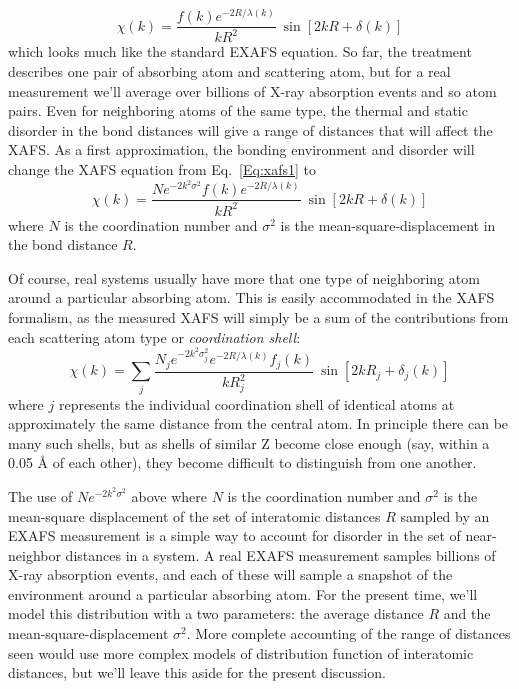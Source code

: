 \begin{equation}
  \chi(k) =
    {\frac{f(k) e^{-2R/\lambda(k)}}{kR^2}}\>  \sin[2kR + \delta(k)]
\label{Eq:xafs1}
\end{equation}
\noindent
which looks much like the standard EXAFS equation.  So far, the treatment
describes one pair of absorbing atom and scattering atom, but for a real
measurement we'll average over billions of X-ray absorption events and so
atom pairs. Even for neighboring atoms of the same type, the thermal and
static disorder in the bond distances will give a range of distances that
will affect the XAFS. As a first approximation, the bonding environment and
disorder will change the XAFS equation from Eq.~\ref{Eq:xafs1} to
\begin{equation}
  \chi(k) =
      {{ \frac{N e^{-2k^2\sigma^2} f(k)e^{-2R/\lambda(k)} }{kR^2}}}\>
      \sin[2kR + \delta(k)]
      \label{Eq:xafs2}
\end{equation}
\noindent
where $N$ is the coordination number and $\sigma^2$ is the
mean-square-displacement in the bond distance $R$.

Of course, real systems usually have more that one type of neighboring atom
around a particular absorbing atom.  This is easily accommodated in the
XAFS formalism, as the measured XAFS will simply be a sum of the
contributions from each scattering atom type or \emph{coordination shell}:
\begin{equation}
  \chi(k) = \sum_j {
    {{ \frac{N_j e^{-2k^2\sigma_j^2}  e^{-2R/\lambda(k)} f_j(k)}{kR_j^2}}}\>
      \sin[2kR_j + \delta_j(k)] }
      \label{Eq:xafs3}
\end{equation}
\noindent
where $j$ represents the individual coordination shell of identical atoms
at approximately the same distance from the central atom.  In principle
there can be many such shells, but as shells of similar Z become close
enough (say, within a 0.05 {\AA} of each other), they become difficult to
distinguish from one another.

The use of $Ne^{-2k^2\sigma^2}$ above where $N$ is the coordination number
and $\sigma^2$ is the mean-square displacement of the set of interatomic
distances $R$ sampled by an EXAFS measurement is a simple way to account
for disorder in the set of near-neighbor distances in a system.  A real
EXAFS measurement samples billions of X-ray absorption events, and each of
these will sample a snapshot of the environment around a particular
absorbing atom.  For the present time, we'll model this distribution with a
two parameters: the average distance $R$ and the mean-square-displacement
$\sigma^2$.    More complete accounting of the range of distances seen would
use more complex models of distribution function of interatomic distances,
but we'll leave this aside for the present discussion.

